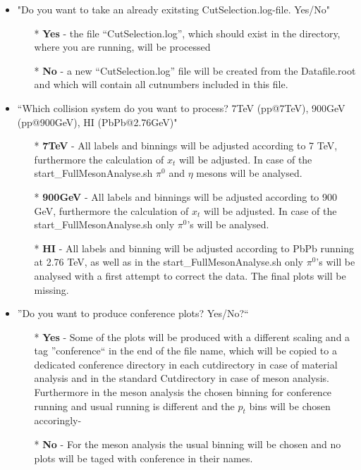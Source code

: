 	\begin{itemize}
	 \item "Do you want to take an already exitsting CutSelection.log-file. Yes/No"
		\begin{itemize}
		 \item [*] \textbf{Yes} - the file ``CutSelection.log'', which should exist in the directory, where you are running, will be processed
		 \item [*] \textbf{No} - a new ``CutSelection.log'' file will be created from the Datafile.root and which will contain all cutnumbers included in this file.
		\end{itemize}
	\item ``Which collision system do you want to process? 7TeV (pp@7TeV), 900GeV (pp@900GeV), HI (PbPb@2.76GeV)"
		\begin{itemize}
		 \item [*] \textbf{7TeV} - All labels and binnings will be adjusted according to 7 TeV, furthermore the calculation of $x_t$ will be adjusted. In case of the start\_FullMesonAnalyse.sh $\pi^0$ and $\eta$ mesons will be analysed.
		 \item [*] \textbf{900GeV}	- All labels and binnings will be adjusted according to 900 GeV, furthermore the calculation of $x_t$ will be adjusted. In case of the start\_FullMesonAnalyse.sh only $\pi^0$'s will be analysed. 
		 \item [*] \textbf{HI}  - All labels and binning will be adjusted according to PbPb running at 2.76 TeV, as well as in the start\_FullMesonAnalyse.sh only $\pi^0$'s will be analysed with a first attempt to correct the data. The final plots will be missing.
		\end{itemize}
	\item ''Do you want to produce conference plots? Yes/No?``
		\begin{itemize}
		 \item [*] \textbf{Yes} - Some of the plots will be produced with a different scaling and a tag ''conference`` in the end of the file name, which will be copied to a dedicated conference directory in each cutdirectory in case of material analysis and in the standard Cutdirectory in case of meson analysis. Furthermore in the meson analysis the chosen binning for conference running and usual running is different and the $p_t$ bins will be chosen accoringly-
		 \item [*] \textbf{No} - For the meson analysis the usual binning will be chosen and no plots will be taged with conference in their names.
		\end{itemize}


\end{itemize}
